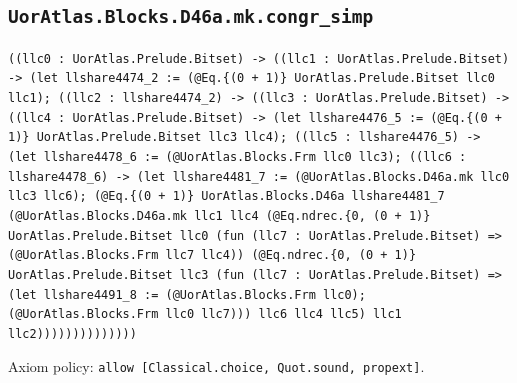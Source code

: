 \documentclass[11pt]{article}
\begin{document}
\subsection*{\texttt{UorAtlas.Blocks.D46a.mk.congr\_simp}}
\noindent\texttt{((llc0 : UorAtlas.Prelude.Bitset) -> ((llc1 : UorAtlas.Prelude.Bitset) -> (let llshare4474\_2 := (@Eq.\{(0 + 1)\} UorAtlas.Prelude.Bitset llc0 llc1); ((llc2 : llshare4474\_2) -> ((llc3 : UorAtlas.Prelude.Bitset) -> ((llc4 : UorAtlas.Prelude.Bitset) -> (let llshare4476\_5 := (@Eq.\{(0 + 1)\} UorAtlas.Prelude.Bitset llc3 llc4); ((llc5 : llshare4476\_5) -> (let llshare4478\_6 := (@UorAtlas.Blocks.Frm llc0 llc3); ((llc6 : llshare4478\_6) -> (let llshare4481\_7 := (@UorAtlas.Blocks.D46a.mk llc0 llc3 llc6); (@Eq.\{(0 + 1)\} UorAtlas.Blocks.D46a llshare4481\_7 (@UorAtlas.Blocks.D46a.mk llc1 llc4 (@Eq.ndrec.\{0, (0 + 1)\} UorAtlas.Prelude.Bitset llc0 (fun (llc7 : UorAtlas.Prelude.Bitset) => (@UorAtlas.Blocks.Frm llc7 llc4)) (@Eq.ndrec.\{0, (0 + 1)\} UorAtlas.Prelude.Bitset llc3 (fun (llc7 : UorAtlas.Prelude.Bitset) => (let llshare4491\_8 := (@UorAtlas.Blocks.Frm llc0); (@UorAtlas.Blocks.Frm llc0 llc7))) llc6 llc4 llc5) llc1 llc2))))))))))))))}\par
\noindent Axiom policy: \texttt{allow [Classical.choice, Quot.sound, propext]}.\par
\end{document}
